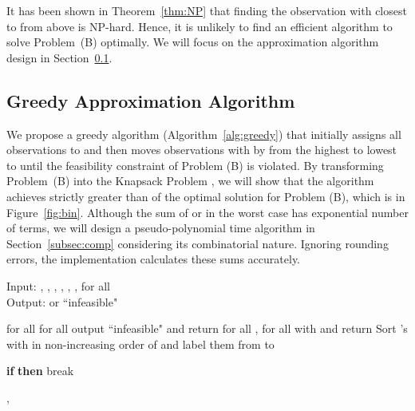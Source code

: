 \documentclass[conference]{IEEEtran}
\begin{document}
It has been shown in Theorem~\ref{thm:NP} that finding the observation with  closest to  from above is NP-hard. Hence, it is unlikely to find an efficient algorithm to solve Problem~(B) optimally. We will focus on the approximation algorithm design in Section~\ref{subsec:greedy}.  

\subsection{Greedy Approximation Algorithm}
\label{subsec:greedy}



We propose a greedy algorithm (Algorithm~\ref{alg:greedy}) that initially assigns all observations to  and then moves observations with  by  from the highest to lowest to  until the feasibility constraint of Problem (B) is violated. By transforming Problem~(B) into the Knapsack Problem \cite{Vijay}, we will show that the algorithm achieves strictly greater than  of the optimal solution for Problem (B), which is  in Figure~\ref{fig:bin}. Although the sum of  or  in the worst case has exponential number of terms, we will design a pseudo-polynomial time algorithm in Section~\ref{subsec:comp} considering its combinatorial nature. Ignoring rounding errors, the implementation calculates these sums accurately.

\begin{algorithm}[t]
    \caption{{\footnotesize Greedy Approximation Algorithm for Problem (B)}}\label{alg:greedy}
    {\scriptsize Input: , , , , , ,  for all  \\Output:  or ``infeasible"}
    \begin{algorithmic}[1]
    {\footnotesize \STATE  for all 
	\STATE  for all 
	\STATE 
	\IF{}
	\STATE output ``infeasible" and return
    \ENDIF
    \STATE  for all , 
    \IF{}
		\STATE  for all  with  and return
    \ENDIF
    \STATE Sort 's with  in non-increasing order of  and label them from  to 
    \STATE 

\STATE \textbf{if}  \textbf{then} break

		\STATE , 

    \ENDFOR}

    \end{algorithmic}
\end{algorithm}
\end{document}
